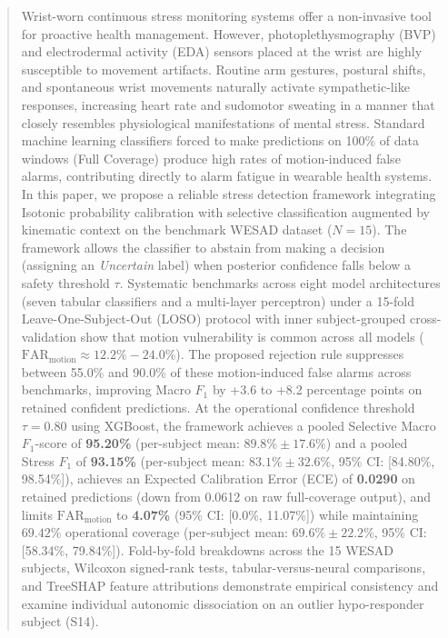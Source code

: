 \documentclass[conference]{IEEEtran}
\begin{document}
\begin{abstract}
Wrist-worn continuous stress monitoring systems offer a non-invasive tool for proactive health management. However, photoplethysmography (BVP) and electrodermal activity (EDA) sensors placed at the wrist are highly susceptible to movement artifacts. Routine arm gestures, postural shifts, and spontaneous wrist movements naturally activate sympathetic-like responses, increasing heart rate and sudomotor sweating in a manner that closely resembles physiological manifestations of mental stress. Standard machine learning classifiers forced to make predictions on 100\% of data windows (Full Coverage) produce high rates of motion-induced false alarms, contributing directly to alarm fatigue in wearable health systems. In this paper, we propose a reliable stress detection framework integrating Isotonic probability calibration with selective classification augmented by kinematic context on the benchmark WESAD dataset ($N=15$). The framework allows the classifier to abstain from making a decision (assigning an \textit{Uncertain} label) when posterior confidence falls below a safety threshold $\tau$. Systematic benchmarks across eight model architectures (seven tabular classifiers and a multi-layer perceptron) under a 15-fold Leave-One-Subject-Out (LOSO) protocol with inner subject-grouped cross-validation show that motion vulnerability is common across all models ($\text{FAR}_{\text{motion}} \approx 12.2\% - 24.0\%$). The proposed rejection rule suppresses between 55.0\% and 90.0\% of these motion-induced false alarms across benchmarks, improving Macro $F_1$ by +3.6 to +8.2 percentage points on retained confident predictions. At the operational confidence threshold $\tau = 0.80$ using XGBoost, the framework achieves a pooled Selective Macro $F_1$-score of \textbf{95.20\%} (per-subject mean: $89.8\% \pm 17.6\%$) and a pooled Stress $F_1$ of \textbf{93.15\%} (per-subject mean: $83.1\% \pm 32.6\%$, 95\% CI: [84.80\%, 98.54\%]), achieves an Expected Calibration Error (ECE) of \textbf{0.0290} on retained predictions (down from 0.0612 on raw full-coverage output), and limits $\text{FAR}_{\text{motion}}$ to \textbf{4.07\%} (95\% CI: [0.0\%, 11.07\%]) while maintaining $69.42\%$ operational coverage (per-subject mean: $69.6\% \pm 22.2\%$, 95\% CI: [58.34\%, 79.84\%]). Fold-by-fold breakdowns across the 15 WESAD subjects, Wilcoxon signed-rank tests, tabular-versus-neural comparisons, and TreeSHAP feature attributions demonstrate empirical consistency and examine individual autonomic dissociation on an outlier hypo-responder subject (S14).
\end{abstract}
\end{document}
